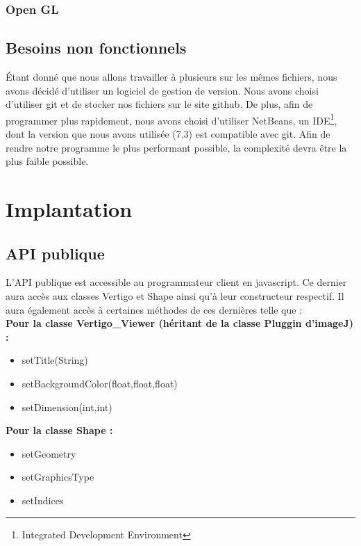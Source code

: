 \documentclass[11pt]{report}
\begin{document}
\subsection{Open GL}
\section{Besoins non fonctionnels}
Étant donné que nous allons travailler à plusieurs sur les mêmes fichiers, nous avons décidé d'utiliser un logiciel de gestion de version. Nous avons choisi d'utiliser git\cite{git} et de stocker nos fichiers sur le site github\cite{github}.
De plus, afin de programmer plus rapidement, nous avons choisi d'utiliser NetBeans\cite{netbeans}, un IDE\footnote{Integrated Development Environment}, dont la version que nous avons utilisée (7.3) est compatible avec git.
Afin de rendre notre programme le plus performant possible, la complexité devra être la plus faible possible. 
\chapter{Implantation} %
\section{API publique} 
L'API publique est accessible au programmateur client en javascript.
Ce dernier aura accès aux classes Vertigo et Shape ainsi qu'à leur constructeur respectif.
Il aura également accès à certaines méthodes de ces dernières telle que : 
\\

\textbf{Pour la classe Vertigo\_Viewer (héritant de la classe Pluggin d'imageJ) :}
\begin{itemize}
\item setTitle(String)
\item setBackgroundColor(float,float,float)
\item setDimension(int,int)
\end{itemize}


\textbf{Pour la classe Shape :}
\begin{itemize}
\item setGeometry %
\item setGraphicsType
\item setIndices %
\end{itemize}
\end{document}
